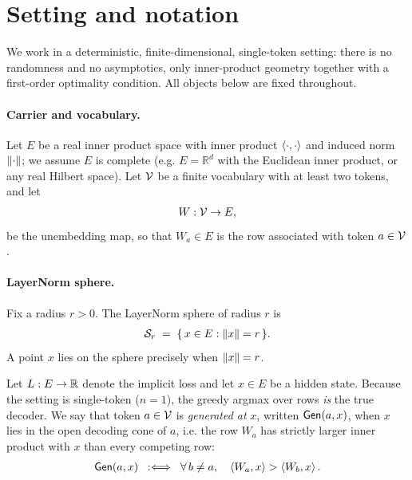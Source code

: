 \section{Setting and notation}
\label{sec:preliminaries}

We work in a deterministic, finite-dimensional, single-token setting: there is no
randomness and no asymptotics, only inner-product geometry together with a first-order
optimality condition. All objects below are fixed throughout.

\paragraph{Carrier and vocabulary.}
Let $E$ be a real inner product space with inner product $\left\langle \cdot, \cdot \right\rangle$ and induced
norm $\left\| \cdot \right\|$; we assume $E$ is complete (e.g. $E = \mathbb{R}^{d}$ with the Euclidean
inner product, or any real Hilbert space). Let $\mathcal{V}$ be a finite vocabulary with at least
two tokens, and let
\begin{align*}
W : \mathcal{V} \to E,
\end{align*}
be the unembedding map, so that $W_{a} \in E$ is the row associated with token $a \in \mathcal{V}$.

\paragraph{LayerNorm sphere.}
Fix a radius $r > 0$. The LayerNorm sphere of radius $r$ is
\begin{align*}
\mathcal{S}_r \;=\; \{\, x \in E : \left\| x \right\| = r \,\}.
\end{align*}
A point $x$ lies on the sphere precisely when $\left\| x \right\| = r$.

\begin{definition}
\label{def:decoder}
Let $L : E \to \mathbb{R}$ denote the implicit loss and let $x \in E$ be a hidden state.
Because the setting is single-token ($n = 1$), the greedy argmax over rows \emph{is} the true
decoder. We say that token $a \in \mathcal{V}$ is \emph{generated at} $x$, written
$\mathsf{Gen}(a, x)$, when $x$ lies in the open decoding cone of $a$, i.e. the row $W_{a}$ has
strictly larger inner product with $x$ than every competing row:
\begin{align*}
\mathsf{Gen}(a, x) \;\;:\Longleftrightarrow\;\; \forall\, b \ne a,\quad \left\langle W_{a}, x \right\rangle > \left\langle W_{b}, x \right\rangle.
\end{align*}
\end{definition}

